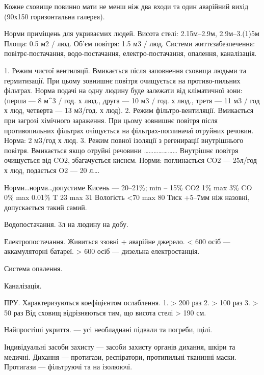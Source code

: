 \documentclass[a4paper,10pt,notitlepage,pdftex,headsepline]{scrartcl}
\begin{document}
    Кожне сховище повинно мати не менш ніж два входи та один аварійний вихід
    (90х150 горизонтальна галерея).

    Норми приміщень для укриваємих людей.
      Висота стелі: 2.15м--2.9м, 2.9м--3.(1)5м
      Площа: 0.5 м2 / люд.
      Об’єм повітря: 1.5 м3 / люд.
      Системи життєзабезпечення: повітрє-постачання, водо-постачання,
        електро-постачання, опалення, каналізація.

      1. Режим чистої вентиляції. Вмикається після заповнення сховища людьми
      та гермитизації. При цьому зовнишнє повітря очищується на
      противо-пильних фільтрах. Норма подачі на одну людину буде залежати від
      кліматичної зони: (перша --- 8 м^3 / год. х люд., друга --- 10 м3 / год.
      х люд., третя --- 11 м3 / год х люд, четверта --- 13 м3/год. х люд).
      2. Режим фільтро-вентиляції. Вмикається при загрозі хімічного зараження.
      При цьому зовнишнє повітря після противопильних фільтрах очіщується на
      фільтрах-поглиначаї отруйних речовин. Норма: 2 м3/год х люд.
      3. Режим повної ізоляції з регенирації внутрішнього повітря.
      Вмикається якщо отруйні речовини
      \ldots\ldots\ldots\ldots\ldots\ldots\ldots
      Внутрішнє повітря очищується від CO2, збагачується киснєм.
      Норми: поглинається CO2 --- 25л/год х люд, подається O2 --- 20 л\ldots.


      Норми\ldots норма\ldots допустиме
      Кисень --- 20--21\%; min -- 15\%
      CO2        1\%        max 3\%
      CO          0\%       max 0.01\%
      T           23        max 31
      Вологість  <70        max 80
      Тиск    +5--7мм ніж назовні,   допускається такий самий.

      Водопостачання.
      3л на людину на добу.

      Електропостачання.
      Живиться ззовні + аварійне джерело.
      < 600 осіб --- аккамуляторні батареї.
      > 600 осіб --- дизельна електростанція.

      Система опалення.

      Каналізація.


  ПРУ. Характеризуються коефіцієнтом ослаблення.
    1. > 200 раз
    2. > 100 раз
    3. > 50 раз
  Від сховищ відрізняються тим, що висота стелі > 190 см.


  Найпростіші укриття. --- усі необладнані підвали та погреби, щілі.


  Індивідуальні засоби захисту --- засоби захисту органів дихання, шкіри та
  медичні.
    Дихання --- протигази, респіратори, протипильні тканинні маски.
      Протигази --- фільтруючі та на ізолюючі.
\end{document}
